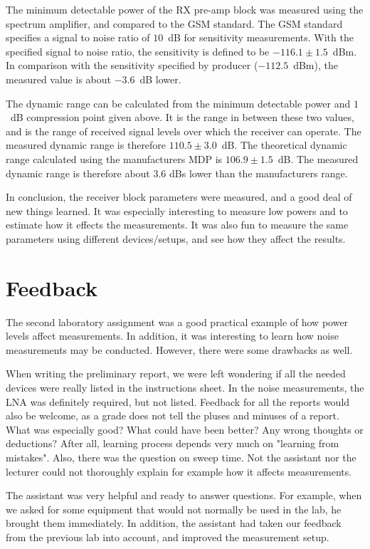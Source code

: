 \documentclass[a4paper, 12pt]{article}
\begin{document}
The minimum detectable power of the RX pre-amp block was measured using the spectrum amplifier, and compared to the GSM standard. The GSM standard specifies a signal to noise ratio of $10$~dB for sensitivity measurements. With the specified signal to noise ratio, the sensitivity is defined to be $-116.1 \pm 1.5$~dBm. In comparison with the sensitivity specified by producer ($-112.5$~dBm), the measured value is about $-3.6$~dB lower.

The dynamic range can be calculated from the minimum detectable power and $1$~dB compression point given above. It is the range in between these two values, and is the range of received signal levels over which the receiver can operate. The measured dynamic range is therefore $110.5 \pm 3.0$~dB. The theoretical dynamic range calculated using the manufacturers MDP is $106.9 \pm 1.5$~dB. The measured dynamic range is therefore about 3.6 dBs lower than the manufacturers range.

In conclusion, the receiver block parameters were measured, and a good deal of new things learned. It was especially interesting to measure low powers and to estimate how it effects the measurements. It was also fun to measure the same parameters using different devices/setups, and see how they affect the results.

\newpage
\section{Feedback}

The second laboratory assignment was a good practical example of how power levels affect measurements. In addition, it was interesting to learn how noise measurements may be conducted. However, there were some drawbacks as well.

When writing the preliminary report, we were left wondering if all the needed devices were really listed in the instructions sheet. In the noise measurements, the LNA was definitely required, but not listed. Feedback for all the reports would also be welcome, as a grade does not tell the pluses and minuses of a report. What was especially good? What could have been better? Any wrong thoughts or deductions? After all, learning process depends very much on "learning from mistakes". Also, there was the question on sweep time. Not the assistant nor the lecturer could not thoroughly explain for example how it affects measurements.

The assistant was very helpful and ready to answer questions. For example, when we asked for some equipment that would not normally be used in the lab, he brought them immediately. In addition, the assistant had taken our feedback from the previous lab into account, and improved the measurement setup.
\end{document}
